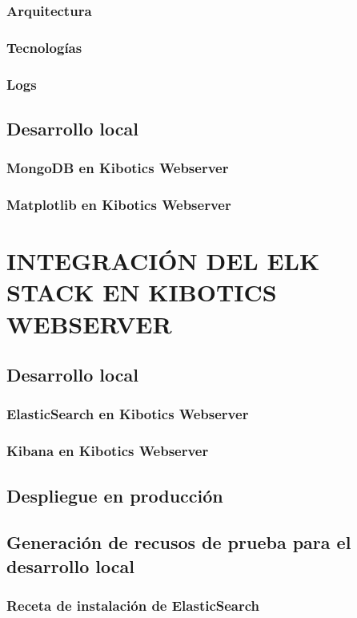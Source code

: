 \documentclass[11pt,a4paper]{book}
\begin{document}
			\subsection{Arquitectura}
			\subsection{Tecnologías}
			\subsection{Logs}
		\section{Desarrollo local}
			\subsection{MongoDB en Kibotics Webserver}
			\subsection{Matplotlib en Kibotics Webserver}
	\chapter{INTEGRACIÓN DEL ELK STACK EN KIBOTICS WEBSERVER}
		\section{Desarrollo local}
			\subsection{ElasticSearch en Kibotics Webserver}
			\subsection{Kibana en Kibotics Webserver}
		\section{Despliegue en producción}
		\section{Generación de recusos de prueba para el desarrollo local}
			\subsection{Receta de instalación de ElasticSearch}
\end{document}
